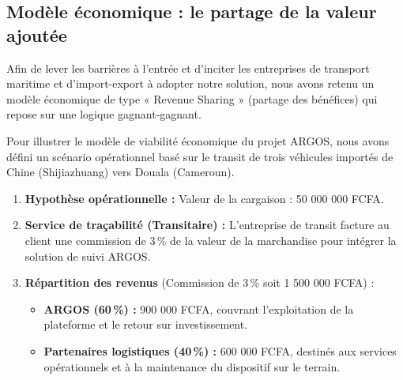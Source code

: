 \subsection{Modèle économique : le partage de la valeur ajoutée}
\label{sec:modele-economique}

Afin de lever les barrières à l’entrée et d’inciter les entreprises de transport maritime et d’import-export à adopter notre solution, nous avons retenu un modèle économique de type « Revenue Sharing » (partage des bénéfices) qui repose sur une logique gagnant-gagnant.

Pour illustrer le modèle de viabilité économique du projet ARGOS, nous avons défini un scénario opérationnel basé sur le transit de trois véhicules importés de Chine (Shijiazhuang) vers Douala (Cameroun).

\begin{enumerate}
    \item \textbf{Hypothèse opérationnelle :} Valeur de la cargaison : 50 000 000 FCFA.
    \item \textbf{Service de traçabilité (Transitaire) :} L’entreprise de transit facture au client une commission de 3\,\% de la valeur de la marchandise pour intégrer la solution de suivi ARGOS.
    \item \textbf{Répartition des revenus} (Commission de 3\,\% soit 1 500 000 FCFA) :
    \begin{itemize}
        \item \textbf{ARGOS (60\,\%) :} 900 000 FCFA, couvrant l'exploitation de la plateforme et le retour sur investissement.
        \item \textbf{Partenaires logistiques (40\,\%) :} 600 000 FCFA, destinés aux services opérationnels et à la maintenance du dispositif sur le terrain.
    \end{itemize}
\end{enumerate}

